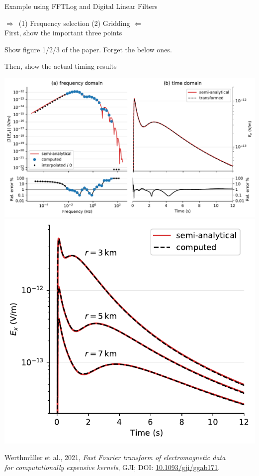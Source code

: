 \documentclass[xcolor=svgnames, usepdftitle=false, aspectratio=169]{beamer}
\newcommand{\bdra}{\ensuremath{\boldsymbol \Rightarrow }~}
\newcommand{\bdla}{\ensuremath{\boldsymbol \Leftarrow }~}
\begin{document}
\begin{frame}
  {Example using FFTLog and Digital Linear Filters}
  \centering

  \bdra \quad (1) Frequency selection \quad (2) Gridding \quad \bdla\\[.5cm]

  First, show the important three points

  Show figure 1/2/3 of the paper. Forget the below ones.

  Then, show the actual timing results

  \includegraphics[width=.4\textwidth]{06-marine}
  \includegraphics[width=.2\textwidth]{07-marine-multioffset}


  {\raggedright\small
  Werthmüller et al., 2021, \emph{Fast Fourier transform of electromagnetic
  data\\for computationally expensive kernels}, GJI; DOI:
  \href{https://doi.org/10.1093/gji/ggab171}{10.1093/gji/ggab171}.\\
  }


\end{frame}
\end{document}
